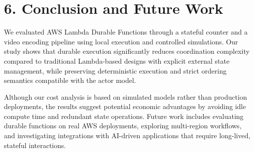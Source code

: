 \section*{6. Conclusion and Future Work}
We evaluated AWS Lambda Durable Functions through a stateful counter and a video encoding pipeline using local execution and controlled simulations. Our study shows that durable execution significantly reduces coordination complexity compared to traditional Lambda-based designs with explicit external state management, while preserving deterministic execution and strict ordering semantics compatible with the actor model.

Although our cost analysis is based on simulated models rather than production deployments, the results suggest potential economic advantages by avoiding idle compute time and redundant state operations. Future work includes evaluating durable functions on real AWS deployments, exploring multi-region workflows, and investigating integrations with AI-driven applications that require long-lived, stateful interactions.

